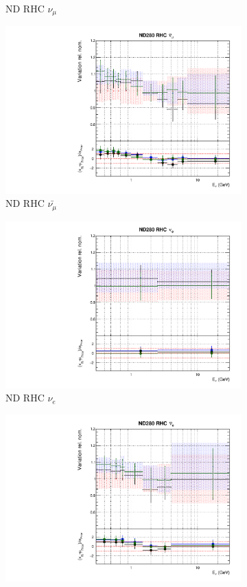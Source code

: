 \begin{figure}
\begin{subfigure}{0.24\textwidth}
  \caption{ND RHC $\nu_{\mu}$}
\end{subfigure}
\begin{subfigure}{0.24\textwidth}
  \centering
  \includegraphics[width=0.95\linewidth]{figs/fgdfitsflux_5}
  \caption{ND RHC $\bar{\nu_{\mu}}$}
\end{subfigure}
\begin{subfigure}{0.24\textwidth}
  \centering
  \includegraphics[width=0.95\linewidth]{figs/fgdfitsflux_6}
  \caption{ND RHC $\nu_{e}$}
\end{subfigure}
\vspace{15mm}
\begin{subfigure}{0.24\textwidth}
  \centering
  \includegraphics[width=0.95\linewidth]{figs/fgdfitsflux_7}

\end{subfigure}
\end{figure}
